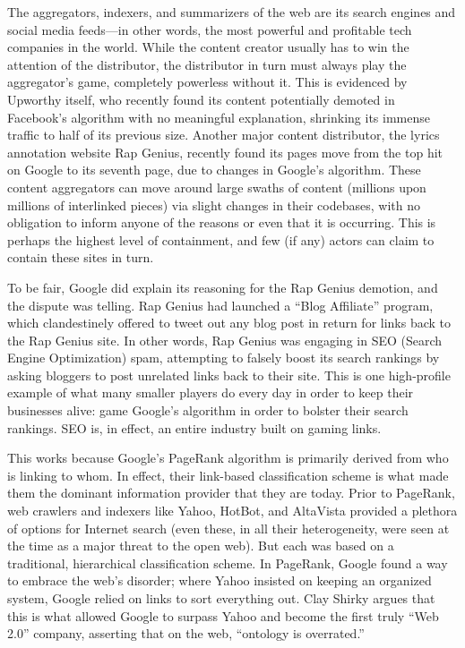 The aggregators, indexers, and summarizers of the web are its search engines and social media feeds—in other words, the most powerful and profitable tech companies in the world. While the content creator usually has to win the attention of the distributor, the distributor in turn must always play the aggregator’s game, completely powerless without it. This is evidenced by Upworthy itself, who recently found its content potentially demoted in Facebook’s algorithm with no meaningful explanation, shrinking its immense traffic to half of its previous size.  Another major content distributor, the lyrics annotation website Rap Genius, recently found its pages move from the top hit on Google to its seventh page, due to changes in Google’s algorithm.  These content aggregators can move around large swaths of content (millions upon millions of interlinked pieces) via slight changes in their codebases, with no obligation to inform anyone of the reasons or even that it is occurring. This is perhaps the highest level of containment, and few (if any) actors can claim to contain these sites in turn.

To be fair, Google did explain its reasoning for the Rap Genius demotion, and the dispute was telling. Rap Genius had launched a “Blog Affiliate” program, which clandestinely offered to tweet out any blog post in return for links back to the Rap Genius site. In other words, Rap Genius was engaging in SEO (Search Engine Optimization) spam, attempting to falsely boost its search rankings by asking bloggers to post unrelated links back to their site. This is one high-profile example of what many smaller players do every day in order to keep their businesses alive: game Google’s algorithm in order to bolster their search rankings. SEO is, in effect, an entire industry built on gaming links.

This works because Google’s PageRank algorithm is primarily derived from who is linking to whom. In effect, their link-based classification scheme is what made them the dominant information provider that they are today. Prior to PageRank, web crawlers and indexers like Yahoo, HotBot, and AltaVista provided a plethora of options for Internet search (even these, in all their heterogeneity, were seen at the time as a major threat to the open web). But each was based on a traditional, hierarchical classification scheme. In PageRank, Google found a way to embrace the web’s disorder; where Yahoo insisted on keeping an organized system, Google relied on links to sort everything out. Clay Shirky argues that this is what allowed Google to surpass Yahoo and become the first truly “Web 2.0” company, asserting that on the web, “ontology is overrated.” 

